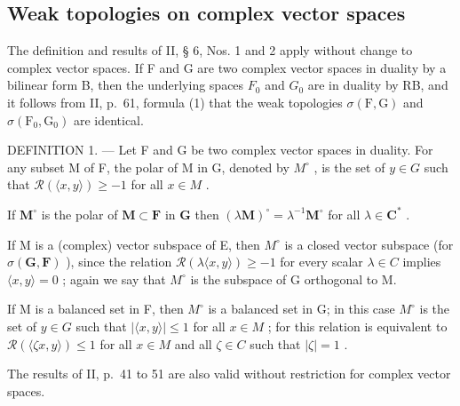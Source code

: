 \subsection{Weak topologies on complex vector spaces}

The definition and results of II, § 6, Nos. 1 and 2 apply without change to complex vector spaces. If F and G are two complex vector spaces in duality by a bilinear form B, then the underlying spaces \(F_{0}\) and \(G_{0}\) are in duality by RB, and it follows from II, p.~61, formula (1) that the weak topologies \(\sigma(\mathrm{F},\mathrm{G})\) and \(\sigma(\mathrm{F}_{0},\mathrm{G}_{0})\) are identical.

DEFINITION 1. --- Let F and G be two complex vector spaces in duality. For any subset M of F, the polar of M in G, denoted by \(M^{\circ}\) , is the set of \(y \in G\) such that \(\mathcal{R}(\langle x, y \rangle) \geqslant -1\) for all \(x \in M\) .

If \(\mathbf{M}^{\circ}\) is the polar of \(\mathbf{M} \subset \mathbf{F}\) in \(\mathbf{G}\) then \((\lambda \mathbf{M})^{\circ} = \lambda^{-1}\mathbf{M}^{\circ}\) for all \(\lambda \in \mathbf{C}^{*}\) .

If M is a (complex) vector subspace of E, then \(M^{\circ}\) is a closed vector subspace (for \(\sigma(\mathbf{G},\mathbf{F})\) ), since the relation \(\mathcal{R}(\lambda\langle x,y\rangle)\geqslant-1\) for every scalar \(\lambda\in C\) implies \(\langle x,y\rangle=0\) ; again we say that \(M^{\circ}\) is the subspace of G orthogonal to M.

If M is a balanced set in F, then \(M^{\circ}\) is a balanced set in G; in this case \(M^{\circ}\) is the set of \(y \in G\) such that \(\left|\langle x, y \rangle\right| \leqslant 1\) for all \(x \in M\) ; for this relation is equivalent to \(\mathcal{R}(\langle \zeta x, y \rangle) \leqslant 1\) for all \(x \in M\) and all \(\zeta \in C\) such that \(|\zeta| = 1\) .

The results of II, p.~41 to 51 are also valid without restriction for complex vector spaces.

